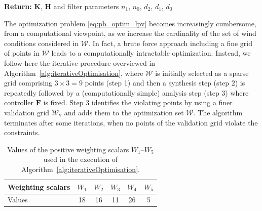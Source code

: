 \begin{algorithm}
\begin{algorithmic}[1]
    \State \label{step:final} 
    \textbf{Return:} $\boldsymbol{K}$, $\boldsymbol{H}$ and filter parameters $n_1$, $n_0$,  $d_2$,  $d_1$,  $d_0$
    
  \end{algorithmic}
\end{algorithm}

The optimization problem \eqref{eq:pb_optim_lpv} becomes increasingly cumbersome, from a computational viewpoint, as we increase the cardinality of the set of wind conditions considered in ${\mathcal W}$. In fact, a brute force approach including a fine grid of points in ${\mathcal W}$ leads to a computationally intractable optimization. Instead, we follow here the
iterative procedure overviewed in Algorithm~\ref{alg:iterativeOptimisation}, 
where ${\mathcal W}$ is initially selected as a sparse grid comprising $3 \times 3 = 9$ points (step 1) and then 
a synthesis step (step 2) is repeatedly followed by a (computationally simple) analysis step (step 3) where controller $\boldsymbol{F}$ is fixed.
Step 3 identifies the violating points by using a finer validation grid ${\mathcal W}_{\text{v}}$ and adds them to 
the optimization set ${\mathcal W}$. The algorithm terminates after some iterations, when no points of the validation grid violate the constraints.

\begin{table}
    \centering
    \begin{tabular}{|l|c|c|c|c|c|} 
    \hline
    Weighting scalars & $W_1$ & $W_2$ & $W_3$ & $W_4$ & $W_5$ \\ \hline
    Values &18 & 16 & 11 & 26 & 5 \\ \hline
    \end{tabular}
    \label{tab:W1-W5}
    \caption{Values of the positive weighting scalars $W_1$--$W_5$ used in the execution of Algorithm~\ref{alg:iterativeOptimisation}.}
\end{table}

